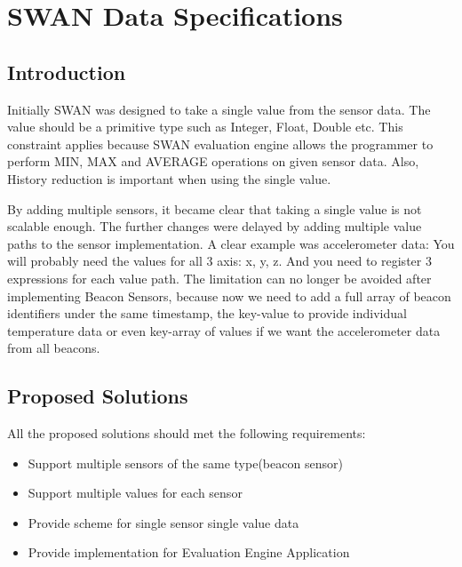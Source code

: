 
\chapter{SWAN Data Specifications} %

\label{Chapter4} %



\section{Introduction}
Initially SWAN was designed to take a single value from the sensor data.
The value should be a primitive type such as Integer, Float, Double etc.
This constraint applies because SWAN evaluation engine allows the programmer to perform MIN, MAX and AVERAGE operations on given sensor data.
Also, History reduction is important when using the single value.

By adding multiple sensors, it became clear that taking a single value is not scalable enough. 
The further changes were delayed by adding multiple value paths to the sensor implementation. 
A clear example was accelerometer data: You will probably need the values for all 3 axis: x, y, z.
And you need to register 3 expressions for each value path.
The limitation can no longer be avoided after implementing Beacon Sensors, because now we need to add a full array of beacon identifiers under the same timestamp,
the key-value to provide individual temperature data or even key-array of values if we want the accelerometer data from all beacons.

\section{Proposed Solutions}
All the proposed solutions should met the following requirements:
\begin{itemize}
 \item Support multiple sensors of the same type(beacon sensor)
 \item Support multiple values for each sensor
 \item Provide scheme for single sensor single value data
 \item Provide implementation for Evaluation Engine Application
\end{itemize}


